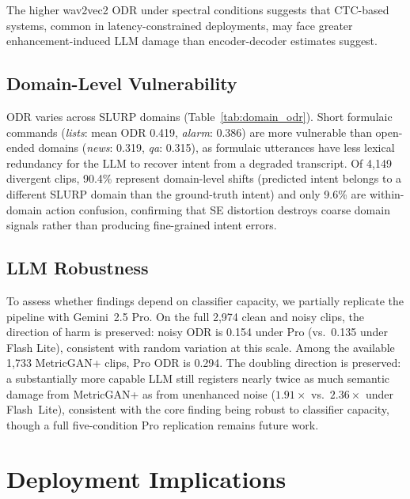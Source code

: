 \documentclass[11pt]{article}
\begin{document}
The higher wav2vec2 ODR under spectral conditions suggests that
CTC-based systems, common in latency-constrained deployments, may
face greater enhancement-induced LLM damage than encoder-decoder
estimates suggest.
 
\subsection{Domain-Level Vulnerability}
 
ODR varies across SLURP domains (Table~\ref{tab:domain_odr}).
Short formulaic commands
(\emph{lists}: mean ODR 0.419, \emph{alarm}: 0.386) are more
vulnerable than open-ended domains (\emph{news}: 0.319,
\emph{qa}: 0.315), as formulaic utterances have less lexical
redundancy for the LLM to recover intent from a degraded transcript.
Of 4{,}149 divergent clips, 90.4\% represent domain-level shifts
(predicted intent belongs to a different SLURP domain than the
ground-truth intent) and only 9.6\% are within-domain action
confusion, confirming that SE distortion destroys coarse domain
signals rather than producing fine-grained intent errors.
 
\subsection{LLM Robustness}
\label{sec:llm_robust}
 
To assess whether findings depend on classifier capacity, we
partially replicate the pipeline with Gemini~2.5 Pro.
On the full 2{,}974 clean and noisy clips, the direction of harm is
preserved: noisy ODR is 0.154 under Pro (vs.\ 0.135 under Flash Lite),
consistent with random variation at this scale.
Among the available 1{,}733 MetricGAN{+} clips, Pro ODR is 0.294.
The doubling direction is preserved: a substantially more capable LLM
still registers nearly twice as much semantic damage from
MetricGAN{+} as from unenhanced noise ($1.91{\times}$ vs.\
$2.36{\times}$ under Flash~Lite), consistent with the core finding
being robust to classifier capacity, though a full five-condition
Pro replication remains future work.
 
\section{Deployment Implications}
\label{sec:implications}
\end{document}

